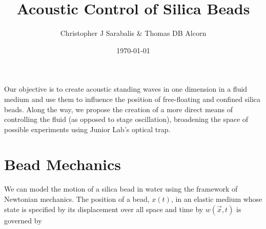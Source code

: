 \usepackage{lgrind}        %
\usepackage{chapterbib}    %
\usepackage{color}         %
\usepackage{graphics}      %
\usepackage[pdftex]{graphicx}      %
\usepackage{longtable}     %
\usepackage{epsf}          %
\usepackage{bm}            %
\usepackage{thumbpdf}
\usepackage[colorlinks=true]{hyperref}  %




\title{Acoustic Control of Silica Beads}
\author         {Christopher J Sarabalis \& Thomas DB Alcorn}
\date{\today}


\begin{abstract}

\end{abstract}

\maketitle

Our objective is to create acoustic standing waves in one dimension in a fluid medium and use them to influence the position of free-floating and confined silica beads. Along the way, we propose the creation of a more direct means of controlling the fluid (as opposed to stage oscillation), broadening the space of possible experiments using Junior Lab's optical trap.

\section{Bead Mechanics}

We can model the motion of a silica bead in water using the framework of Newtonian mechanics.  The position of a bead, $x\left(t\right)$, in an elastic medium whose state is specified by its displacement over all space and time by $w\left(\vec{x},t\right)$ is governed by

